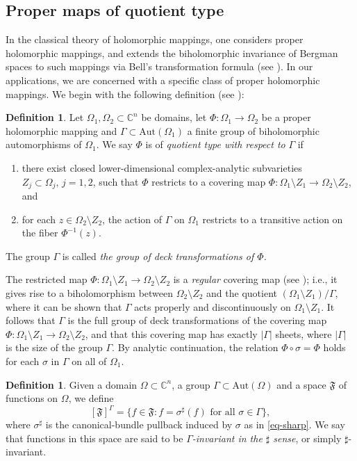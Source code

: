 \documentclass[letterpaper,11pt,reqno]{amsart}
\theoremstyle{plain}
\theoremstyle{definition}
\newtheorem{definition}[equation]{Definition}
\theoremstyle{remark}
\theoremstyle{remark}
\numberwithin{equation}{section}
\newcommand{\abs}[1]{\left\vert#1\right\vert}
\newcommand{\cx}{{\mathbb C}}
\begin{document}
\subsection{Proper maps of quotient type}\label{SSS:Prop-mps-quotient-type}
In the classical theory of holomorphic mappings, one considers proper holomorphic mappings, and extends the biholomorphic invariance of Bergman spaces to such mappings via Bell's transformation formula (see \cite{bellduke,belltransactions,difo,bellcat}). 
In our applications, we are concerned with a specific class of proper holomorphic mappings. We begin with the following definition (see \cite{bcem}):
\begin{definition}\label{def-quotienttype}
Let $\Omega_1, \Omega_2\subset\cx^n$ be domains, let $\Phi: \Omega_1\to \Omega_2$ be a proper holomorphic mapping and $\Gamma\subset \mathrm{Aut}(\Omega_1)$ a finite group of biholomorphic automorphisms of $\Omega_1$. 
We say $\Phi$ is of \emph{quotient type with respect to} $\Gamma$ if
\begin{enumerate}
    \item there exist closed lower-dimensional complex-analytic subvarieties $Z_j\subset \Omega_j,\, j=1,2$, such that $\Phi$ restricts to a covering map $\Phi: \Omega_1\setminus Z_1 \to \Omega_2\setminus Z_2$, and
    \item for each $z\in \Omega_2\setminus Z_2$, the action of $\Gamma$ on $\Omega_1$ restricts to a transitive action on the fiber $\Phi^{-1}(z)$.
\end{enumerate}
The group $\Gamma$ is called {\em the group of deck transformations of $\Phi$.}
\end{definition}

The restricted map $\Phi:\Omega_1\setminus Z_1 \to \Omega_2 \setminus Z_2$ is a \emph{regular} covering map (see \cite[page~135 ff.]{massey}); i.e., it gives rise to a biholomorphism between $\Omega_2\setminus Z_2$ and the quotient $(\Omega_1\setminus Z_1)/\Gamma$, where it can be shown  that $\Gamma$ acts properly and discontinuously on $ \Omega_1\setminus Z_1$. 
It follows that $\Gamma$ is the full group of deck transformations of the  covering map $\Phi:\Omega_1\setminus Z_1 \to \Omega_2\setminus Z_2$, and that this covering map has exactly $\abs{\Gamma}$ sheets, where $|\Gamma|$ is the size of the group $\Gamma$. 
By analytic continuation, the relation $\Phi\circ\sigma=\Phi$ holds for each $\sigma$ in $\Gamma$ on all of $\Omega_1$.

\begin{definition}\label{eq-gammainv-sharp}
Given a domain $\Omega\subset \cx^n$, a group $\Gamma \subset \mathrm{Aut}(\Omega)$ and a space $\mathfrak{F}$ of functions on $\Omega$, we define
\begin{equation}\label{eq-gammainv}
   \left[\mathfrak{F}\right]^\Gamma = \{f\in \mathfrak{F} : f=  \sigma^\sharp(f) \text{ for all } \sigma \in \Gamma \}, 
\end{equation}
where $\sigma^\sharp$ is the canonical-bundle pullback induced by $\sigma$ as in \eqref{eq-sharp}. 
We say that functions in this space are said to be {\em $\Gamma$-invariant in the $\sharp$ sense}, or simply {$\sharp$-invariant}. 
\end{definition}
\end{document}
